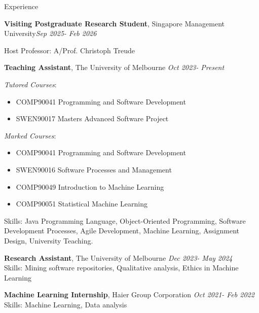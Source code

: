 \documentclass{resume}
\begin{document}
\begin{rSection}{Experience}

{\bf Visiting Postgraduate Research Student}{, Singapore Management University}\hfill {\em Sep 2025- Feb 2026}

Host Professor: A/Prof. Christoph Treude



{\bf Teaching Assistant}{, The University of Melbourne} \hfill {\em Oct 2023- Present}

\textit{Tutored Courses}:
\begin{itemize}
    \item COMP90041 Programming and Software Development
    \item SWEN90017 Masters Advanced Software Project
\end{itemize}

\textit{Marked Courses}:
\begin{itemize}
    \item COMP90041 Programming and Software Development
    \item SWEN90016 Software Processes and Management
    \item COMP90049 Introduction to Machine Learning
    \item COMP90051 Statistical Machine Learning
\end{itemize}

Skills: Java Programming Language, Object-Oriented Programming, Software Development Processes, Agile Development, Machine Learning, Assignment Design, University Teaching.


{\bf Research Assistant}{, The University of Melbourne} \hfill {\em Dec 2023- May 2024}\\
Skills: Mining software repositories, Qualitative analysis, Ethics in Machine Learning

{\bf Machine Learning Internship}{, Haier Group Corporation} \hfill {\em Oct 2021- Feb 2022}\\
Skills: Machine Learning, Data analysis

\end{rSection}
\end{document}
